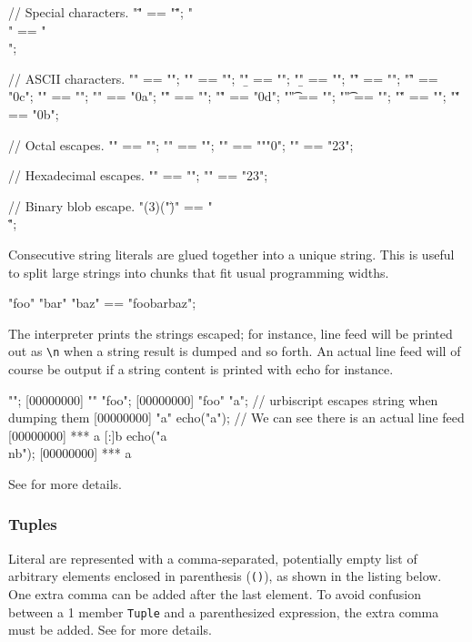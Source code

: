 \begin{urbiassert}
// Special characters.
"\"" == "\"";
"\\" == "\\";

// ASCII characters.
"\a" == ""; "\a" == "";
"\b" == ""; "\b" == "";
"\f" == ""; "\f" == "\x0c";
"\n" == ""; "\n" == "\x0a";
"\r" == ""; "\r" == "\x0d";
"\t" == ""; "\t" == "";
"\v" == ""; "\v" == "\x0b";

// Octal escapes.
"\0" == ""; "\0" == "";
"" == "\0""0";
"" == "23";

// Hexadecimal escapes.
"" == "\0";
"" == "23";

// Binary blob escape.
"\B(3)("\")" == "\"\\\"";
\end{urbiassert}

Consecutive string literals are glued together into a unique string.
This is useful to split large strings into chunks that fit usual
programming widths.

\begin{urbiassert}
"foo" "bar" "baz" == "foobarbaz";
\end{urbiassert}

The interpreter prints the strings escaped; for instance, line feed
will be printed out as \lstinline|\n| when a string result is dumped
and so forth. An actual line feed will of course be output if a string
content is printed with echo for instance.

\begin{urbiscript}
"";
[00000000] ""
"foo";
[00000000] "foo"
"a\nb"; // urbiscript escapes string when dumping them
[00000000] "a\nb"
echo("a\nb"); // We can see there is an actual line feed
[00000000] *** a
[:]b
echo("a\\nb");
[00000000] *** a\nb
\end{urbiscript}

See  for more details.

\subsubsection{Tuples}
\label{sec:us-syn-lit-tuples}

Literal  are represented with a comma-separated, potentially
empty list of arbitrary elements enclosed in parenthesis (\lstinline|()|),
as shown in the listing below.  One extra comma can be added after the last
element.  To avoid confusion between a 1 member \lstinline|Tuple| and a
parenthesized expression, the extra comma must be added.  See
 for more details.

